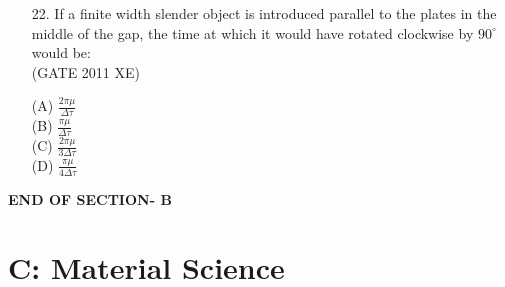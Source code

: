 \documentclass[journal,12pt,onecolumn]{IEEEtran}
\begin{document}
\begin{enumerate}
\item[22.] If a finite width slender object is introduced parallel to the plates in the middle of the gap, the time at which it would have rotated clockwise by $90^\circ$ would be:\\

\hfill{(GATE 2011 XE)} \\
\begin{multicols}{4}
(A) $\frac{2\pi\mu}{\Delta\tau}$\\
(B) $\frac{\pi\mu}{\Delta\tau}$\\
(C) $\frac{2\pi\mu}{3\Delta\tau}$\\
(D) $\frac{\pi\mu}{4\Delta\tau}$
\end{multicols}

\end{enumerate}

\vspace{1\baselineskip}
    \begin{center}
    \textbf{\Large END OF SECTION- B}
    \end{center}


\newpage
\section{C: Material Science}
\end{document}
